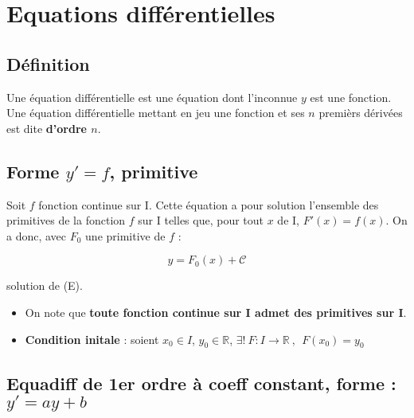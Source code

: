 \documentclass{report}
\newcommand{\pc}{+ \mathcal{C}}
\begin{document}
    \newpage

    \section{Equations différentielles}

      \subsection{Définition}

        Une équation différentielle est une équation dont l'inconnue $y$ est une fonction.
        Une équation différentielle mettant en jeu une fonction et ses $n$ premièrs dérivées est dite \textbf{d'ordre $n$}.

      \subsection{Forme $y' = f$, primitive}

        Soit $f$ fonction continue sur I. Cette équation a pour solution l'ensemble des primitives de la fonction $f$ sur I telles que, pour tout $x$ de I, $F'(x) = f(x)$. On a donc, avec $F_0$ une primitive de $f$ : 

        \[\boxed{y = F_0(x) \pc}\]

        solution de (E). 
        \begin{itemize}
          \item On note que \textbf{toute fonction continue sur I admet des primitives sur I}.
          \item \textbf{Condition initale} : soient $x_0 \in I$, $y_0 \in \mathbb{R}$, $\boxed{\exists ! ~F : I \to \mathbb{R} ~, ~~F(x_0) = y_0}$
        \end{itemize}

      \iffalse\subsection{Forme $y' = a y$}

        La solution générale est donnée par :
        \[\boxed{y(x) = C e^{a x}}\]
        où $C \in \mathbb{R}$ est une constante d'intégration.
        \fi

      \subsection{Equadiff de 1er ordre à coeff constant, forme :  $y' = a y + b$}
\end{document}
